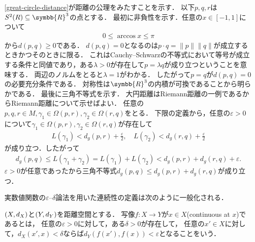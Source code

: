 \documentclass{ltjsbook}
\begin{document}
\begin{specialexample}
\eqref{great-circle-distance}が距離の公理をみたすことを示す．
以下\(p, q, r\)は\(S^2(R) \subseteq \symbb{R}^3\)の点とする．
最初に非負性を示す．任意の\(x \in [-1 , 1]\)について
\begin{align*}
    0 \leq \arccos x \leq \pi
\end{align*}
から\(d(p, q) \geq 0\)である．
\(d(p, q) = 0\)となるのは\(p \cdot q = \lVert p \rVert \lVert q \rVert\)が成立するときかつそのときに限る．
これはCauchy--Schwarzの不等式において等号が成立する条件と同値であり，ある\(\lambda > 0\)が存在して\(p = \lambda q\)が成り立つということを意味する．
両辺のノルムをとると\(\lambda = 1\)がわかる．
したがって\(p = q\)が\(d(p, q) = 0\)の必要充分条件である．
対称性は\(\symbb{R}^3\)の内積が可換であることから明らかである．
最後に三角不等式を示す．
大円距離はRiemann距離の一例であるからRiemann距離について示せばよい．
任意の\(p, q, r\in M, \gamma_1 \in \Omega(p, r), \gamma_2 \in \Omega(r, q)\)をとる．
下限の定義から，任意の\(\varepsilon > 0\)について\(\gamma_1 \in \Omega(p, r), \gamma_2 \in \Omega(r, q)\)が存在して
\begin{gather*}
    L(\gamma_1) < d_g(p, r) + \frac{\varepsilon}{2},
    \quad
    L(\gamma_2) < d_g(r, q) + \frac{\varepsilon}{2}
\end{gather*}
が成り立つ．したがって
\begin{align*}
    d_g(p, q) \leq L(\gamma_1 + \gamma_2)
            = L(\gamma_1) + L(\gamma_2)
            < d_g(p, r) + d_g(r, q) + \varepsilon.
\end{align*}
\(\varepsilon > 0\)が任意であったから三角不等式\(d_g(p, q) \leq d_g(p, r) + d_g(r, q)\)が成り立つ．

\end{specialexample}

実数値関数の\(\varepsilon\)--\(\delta\)論法を用いた連続性の定義は次のように一般化される．

\begin{thmbox}
\begin{definition}
\((X, d_{X})\)と\((Y, d_{Y})\)を距離空間とする．
写像\(f\colon X \to Y\)が\(x \in X\)(continuous at \(x\))であるとは，
任意の\(\varepsilon > 0\)に対して，ある\(\delta > 0\)が存在して，
任意の\(x' \in X\)に対して，\(d_{X}(x', x) < \delta\)ならば\(d_{Y}(f(x'), f(x)) < \varepsilon\)となることをいう．
\end{definition}
\end{thmbox}
\end{document}

